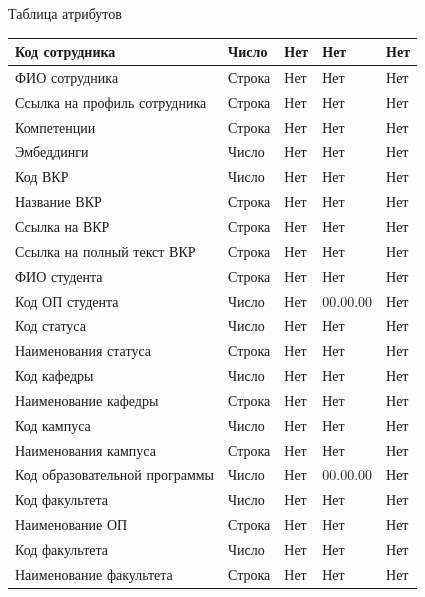 \documentclass[PI,KR]{HSEUniversity}
\begin{document}
\begin{TABLE}[!h]{Таблица атрибутов \label{tbl:tableDB}}
\begin{tabular}[c]{|p{4cm}|l|p{3cm}|l|p{3cm}|}
		Код сотрудника	 				& Число  & Нет & Нет 		& Нет \\ \hline
		ФИО сотрудника	 				& Строка & Нет & Нет 		& Нет \\ \hline	
		Ссылка на профиль сотрудника    & Строка & Нет & Нет 		& Нет \\ \hline
		Компетенции 					& Строка & Нет & Нет 		& Нет \\ \hline
		Эмбеддинги 						& Число  & Нет & Нет 		& Нет \\ \hline
		Код ВКР 						& Число  & Нет & Нет 		& Нет \\ \hline
		Название ВКР 					& Строка & Нет & Нет 		& Нет \\ \hline
		Ссылка на ВКР 					& Строка & Нет & Нет 		& Нет \\ \hline
		Ссылка на полный текст ВКР 		& Строка & Нет & Нет 		& Нет \\ \hline
		ФИО студента 					& Строка & Нет & Нет 		& Нет \\ \hline
		Код ОП студента 				& Число  & Нет & 00.00.00	& Нет \\ \hline
		Код статуса 					& Число  & Нет & Нет		& Нет \\ \hline
		Наименования статуса 			& Строка & Нет & Нет 		& Нет \\ \hline
		Код кафедры 					& Число  & Нет & Нет 		& Нет \\ \hline
		Наименование кафедры 			& Строка & Нет & Нет 		& Нет \\ \hline
		Код кампуса 					& Число  & Нет & Нет 		& Нет \\ \hline
		Наименования кампуса 			& Строка & Нет & Нет 		& Нет \\ \hline
		Код образовательной программы 	& Число  & Нет & 00.00.00 	& Нет \\ \hline
		Код факультета		 			& Число  & Нет & Нет 		& Нет \\ \hline
		Наименование ОП 				& Строка & Нет & Нет	 	& Нет \\ \hline
		Код факультета 					& Число  & Нет & Нет 		& Нет \\ \hline
		Наименование факультета 		& Строка & Нет & Нет 		& Нет \\ \hline
	\end{tabular}
\end{TABLE}
\end{document}
